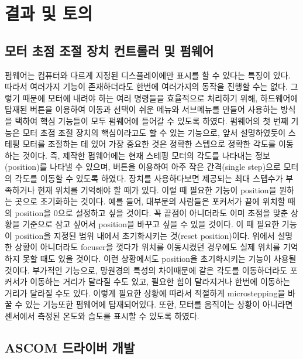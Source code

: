 \section{결과 및 토의}

\subsection{모터 초점 조절 장치 컨트롤러 및 펌웨어}

펌웨어는 컴퓨터와 다르게 지정된 디스플레이에만 표시를 할 수 있다는 특징이 있다. 따라서 여러가지 기능이 존재하더라도 한번에 여러가지의 동작을 진행할 수는 없다. 그렇기 때문에 모터에 내려야 하는 여러 명령들을 효율적으로 처리하기 위해, 하드웨어에 탑재된 버튼을 이용하여 이동과 선택이 쉬운 메뉴와 서브메뉴를 만들어 사용하는 방식을 택하여 핵심 기능들이 모두 펌웨어에 들어갈 수 있도록 하였다.
펌웨어의 첫 번째 기능은 모터 초점 조절 장치의 핵심이라고도 할 수 있는 기능으로, 앞서 설명하였듯이 스테핑 모터를 조절하는 데 있어 가장 중요한 것은 정확한 스텝으로 정확한 각도를 이동하는 것이다. 즉, 제작한 펌웨어에는 현재 스테핑 모터의 각도를 나타내는 정보(position)를 나타낼 수 있으며, 버튼을 이용하여 아주 작은 간격(single step)으로 모터의 각도를 이동할 수 있도록 하였다.
장치를 사용하다보면 제공되는 최대 스텝수가 부족하거나 현재 위치를 기억해야 할 때가 있다. 이럴 때 필요한 기능이 position을 원하는 곳으로 초기화하는 것이다. 예를 들어, 대부분의 사람들은 포커서가 끝에 위치할 때의 position을 0으로 설정하고 싶을 것이다. 꼭 끝점이 아니더라도 이미 초점을 맞춘 상황을 기준으로 삼고 싶어서 position을 바꾸고 싶을 수 있을 것이다. 이 때 필요한 기능이 position을 지정된 범위 내에서 초기화시키는 것(reset position)이다. 위에서 설명한 상황이 아니더라도 focuser을 껏다가 위치를 이동시켰던 경우에도 실제 위치를 기억하지 못할 때도 있을 것이다. 이런 상황에서도 position을 초기화시키는 기능이 사용될 것이다.
부가적인 기능으로, 망원경의 특성의 차이때문에 같은 각도를 이동하더라도 포커서가 이동하는 거리가 달라질 수도 있고, 필요한 힘이 달라지거나 한번에 이동하는 거리가 달라질 수도 있다. 이렇게 필요한 상황에 따라서 적절하게 microstepping을 바꿀 수 있는 기능또한 펌웨어에 탑재되어있다. 또한, 모터를 움직이는 상황이 아니라면 센서에서 측정된 온도와 습도를 표시할 수 있도록 하였다.

\subsection{ASCOM 드라이버 개발}

